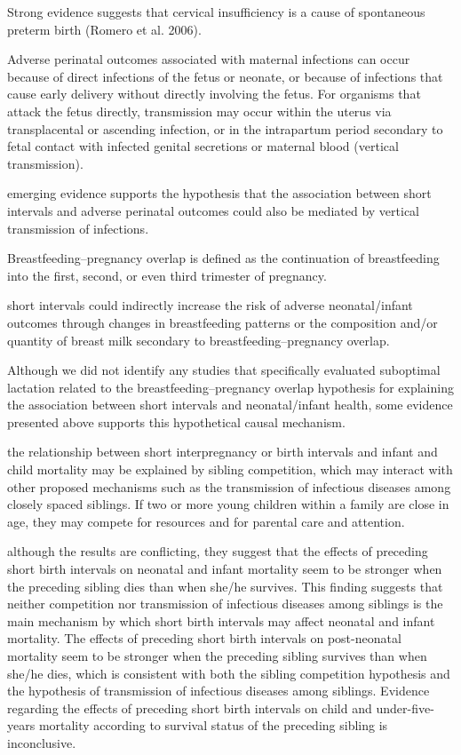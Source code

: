 Strong evidence suggests that cervical insufficiency is a cause of
spontaneous preterm birth (Romero et al. 2006).

Adverse perinatal outcomes associated with maternal infections can occur
because of direct infections of the fetus or neonate, or because of
infections that cause early delivery without directly involving the
fetus. For organisms that attack the fetus directly, transmission may
occur within the uterus via transplacental or ascending infection, or in
the intrapartum period secondary to fetal contact with infected genital
secretions or maternal blood (vertical transmission).

emerging evidence supports the hypothesis that the association between
short intervals and adverse perinatal outcomes could also be mediated by
vertical transmission of infections.

Breastfeeding–pregnancy overlap is defined as the continuation of
breastfeeding into the first, second, or even third trimester of
pregnancy.

short intervals could indirectly increase the risk of adverse
neonatal/infant outcomes through changes in breastfeeding patterns or
the composition and/or quantity of breast milk secondary to
breastfeeding–pregnancy overlap.

Although we did not identify any studies that specifically evaluated
suboptimal lactation related to the breastfeeding–pregnancy overlap
hypothesis for explaining the association between short intervals and
neonatal/infant health, some evidence presented above supports this
hypothetical causal mechanism.

the relationship between short interpregnancy or birth intervals and
infant and child mortality may be explained by sibling competition,
which may interact with other proposed mechanisms such as the
transmission of infectious diseases among closely spaced siblings. If
two or more young children within a family are close in age, they may
compete for resources and for parental care and attention.

although the results are conflicting, they suggest that the effects of
preceding short birth intervals on neonatal and infant mortality seem to
be stronger when the preceding sibling dies than when she/he survives.
This finding suggests that neither competition nor transmission of
infectious diseases among siblings is the main mechanism by which short
birth intervals may affect neonatal and infant mortality. The effects of
preceding short birth intervals on post-neonatal mortality seem to be
stronger when the preceding sibling survives than when she/he dies,
which is consistent with both the sibling competition hypothesis and the
hypothesis of transmission of infectious diseases among siblings.
Evidence regarding the effects of preceding short birth intervals on
child and under-five-years mortality according to survival status of the
preceding sibling is inconclusive.

